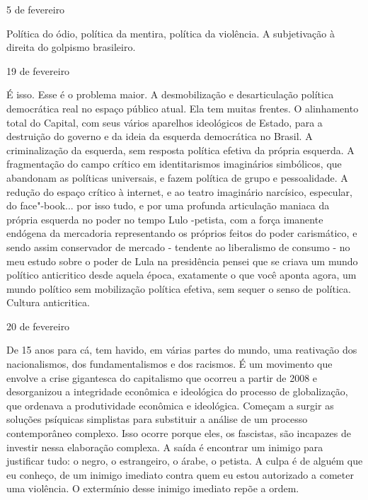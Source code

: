 \begin{flushright}
5 de fevereiro
\end{flushright}

Política do ódio, política da mentira, política da violência. A
subjetivação à direita do golpismo brasileiro.

\begin{flushright}
19 de fevereiro
\end{flushright}

É isso. Esse é o problema maior. A desmobilização e desarticulação
política democrática real no espaço público atual. Ela tem muitas
frentes. O alinhamento total do Capital, com seus vários aparelhos
ideológicos de Estado, para a destruição do governo e da ideia da
esquerda democrática no Brasil. A criminalização da esquerda, sem
resposta política efetiva da própria esquerda. A fragmentação do campo
crítico em identitarismos imaginários simbólicos, que abandonam as
políticas universais, e fazem política de grupo e pessoalidade. A
redução do espaço crítico à internet, e ao teatro imaginário narcísico,
especular, do face"-book... por isso tudo, e por uma profunda articulação
maniaca da própria esquerda no poder no tempo Lulo -petista, com a força
imanente endógena da mercadoria representando os próprios feitos do
poder carismático, e sendo assim conservador de mercado - tendente ao
liberalismo de consumo - no meu estudo sobre o poder de Lula na
presidência pensei que se criava um mundo político anticritico desde
aquela época, exatamente o que você aponta agora, um mundo político sem
mobilização política efetiva, sem sequer o senso de política. Cultura
anticritica.

\begin{flushright}
20 de fevereiro
\end{flushright}

De 15 anos para cá, tem havido, em várias partes do mundo, uma
reativação dos nacionalismos, dos fundamentalismos e dos racismos. É um
movimento que envolve a crise gigantesca do capitalismo que ocorreu a
partir de 2008 e desorganizou a integridade econômica e ideológica do
processo de globalização, que ordenava a produtividade econômica e
ideológica. Começam a surgir as soluções psíquicas simplistas para
substituir a análise de um processo contemporâneo complexo. Isso ocorre
porque eles, os fascistas, são incapazes de investir nessa elaboração
complexa. A saída é encontrar um inimigo para justificar tudo: o negro,
o estrangeiro, o árabe, o petista. A culpa é de alguém que eu conheço,
de um inimigo imediato contra quem eu estou autorizado a cometer uma
violência. O extermínio desse inimigo imediato repõe a ordem.

